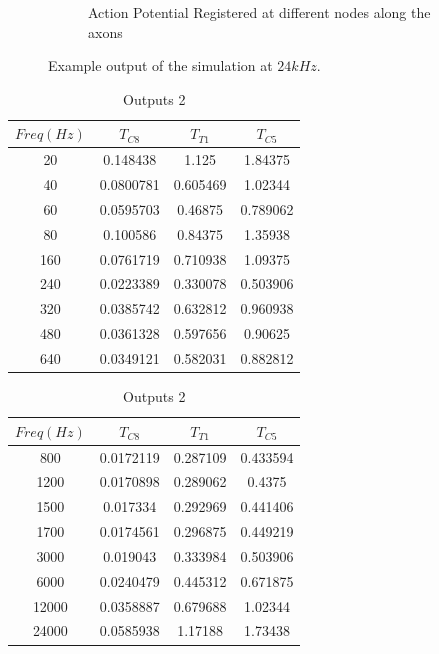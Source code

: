 \documentclass[letterpaper,12pt]{article}
\begin{document}
\begin{figure}[H]
\begin{subfigure}[b]{0.45\textwidth}
        \caption{Action Potential Registered at different nodes along the axons}
        \label{fig:action_potential}
    \end{subfigure}
    \caption{Example output of the simulation at $24kHz$.}
    \label{fig:combined}
\end{figure}

\begin{table}[H]
    \centering
    \scriptsize
    \begin{minipage}[t]{0.45\textwidth}
    \centering
    \begin{tabular}{|c|c|c|c|}
    \toprule
    \textbf{$Freq (Hz)$} & \textbf{$T_{C8}$} & \textbf{$T_{T1}$} & \textbf{$T_{C5}$} \\
    \midrule
    20	 &0.148438	 &1.125	     &1.84375 \\
    40	 &0.0800781	 &0.605469	 &1.02344 \\
    60	 &0.0595703	 &0.46875	 &0.789062 \\
    80	 &0.100586	 &0.84375	 &1.35938 \\
    160	 &0.0761719	 &0.710938	 &1.09375 \\
    240	 &0.0223389	 &0.330078	 &0.503906 \\
    320	 &0.0385742	 &0.632812	 &0.960938 \\
    480	 &0.0361328	 &0.597656	 &0.90625 \\
    640	 &0.0349121	 &0.582031	 &0.882812 \\
    \bottomrule
    \end{tabular}
    \caption{Outputs 1}
    \end{minipage}\hfill
    \begin{minipage}[t]{0.45\textwidth}
    \centering
    \begin{tabular}{|c|c|c|c|}
    \toprule
    \textbf{$Freq (Hz)$} & \textbf{$T_{C8}$} & \textbf{$T_{T1}$} & \textbf{$T_{C5}$} \\
    \midrule
    800	    &0.0172119	&0.287109	&0.433594 \\
    1200	&0.0170898	&0.289062	&0.4375 \\
    1500	&0.017334	&0.292969	&0.441406 \\
    1700	&0.0174561	&0.296875	&0.449219 \\
    3000	&0.019043	&0.333984	&0.503906 \\
    6000	&0.0240479	&0.445312	&0.671875 \\
    12000	&0.0358887	&0.679688	&1.02344 \\
    24000	&0.0585938	&1.17188	&1.73438 \\
    \bottomrule
    \end{tabular}
    \caption{Outputs 2}
    \end{minipage}
\end{table}
\end{document}
